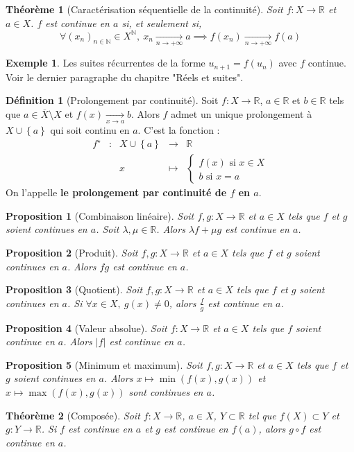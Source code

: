 \documentclass[french]{book}
\newcommand{\N}{\mathbb{N}}
\newcommand{\R}{\mathbb{R}}
\newcommand{\st}{^\star}
\theoremstyle{plain}
\newtheorem{thm}{Théorème}[chapter]
\newtheorem{prop}{Proposition}[chapter]
\theoremstyle{definition}
\newtheorem{dfn}{Définition}[chapter]
\newtheorem{exa}{Exemple}[chapter]
\theoremstyle{remark}
\begin{document}
\begin{thm}[Caractérisation séquentielle de la continuité]
	Soit $f:X\rightarrow\R$ et $a\in X$. $f$ est continue en $a$ si, et seulement si, $$\forall (x_n)_{n\in\N}\in X^\N,\ x_n\xrightarrow[n\to+\infty]{}a\implies f(x_n)\xrightarrow[n\to+\infty]{}f(a)$$
\end{thm}
\begin{exa}
	Les suites récurrentes de la forme $u_{n+1}=f(u_n)$ avec $f$ continue. Voir le dernier paragraphe du chapitre "Réels et suites".
\end{exa}
\begin{dfn}[Prolongement par continuité]
	Soit $f:X\rightarrow\R$, $a\in \R$ et $b\in\R$ tels que $a\in\overline{X}\setminus X$ et $f(x)\xrightarrow[x\to a]{}b$. Alors $f$ admet un unique prolongement à $X\cup\left\{a\right\}$ qui soit continu en $a$. C'est la fonction : $$\begin{array}{ccccc}f\st&:&X\cup\left\{a\right\}&\rightarrow&\R\\ &&x&\mapsto&\begin{cases}
			f(x)\text{ si }x\in X \\ b\text{ si }x=a
	\end{cases}\end{array}$$ On l'appelle \textbf{le prolongement par continuité de $f$ en $a$}.
\end{dfn}
\begin{prop}[Combinaison linéaire]
	Soit $f,g:X\rightarrow\R$ et $a\in X$ tels que $f$ et $g$ soient continues en $a$. Soit $\lambda,\mu\in\R$. Alors $\lambda f+\mu g$ est continue en $a$.
\end{prop}
\begin{prop}[Produit]
	Soit $f,g:X\rightarrow\R$ et $a\in X$ tels que $f$ et $g$ soient continues en $a$. Alors $fg$ est continue en $a$.
\end{prop}
\begin{prop}[Quotient]
	Soit $f,g:X\rightarrow\R$ et $a\in X$ tels que $f$ et $g$ soient continues en $a$. Si $\forall x\in X,\ g(x)\ne0$, alors $\displaystyle\frac{f}{g}$ est continue en $a$.
\end{prop}
\begin{prop}[Valeur absolue]
	Soit $f:X\rightarrow\R$ et $a\in X$ tels que $f$ soient continue en $a$. Alors $\lvert f\rvert$ est continue en $a$.
\end{prop}
\begin{prop}[Minimum et maximum]
	Soit $f,g:X\rightarrow\R$ et $a\in X$ tels que $f$ et $g$ soient continues en $a$. Alors $x\mapsto\min(f(x),g(x))$ et $x\mapsto\max(f(x),g(x))$ sont continues en $a$.
\end{prop}
\begin{thm}[Composée]
	Soit $f:X\rightarrow\R$, $a\in X$, $Y\subset\R$ tel que $f(X)\subset Y$ et $g:Y\rightarrow\R$. Si $f$ est continue en $a$ et $g$ est continue en $f(a)$, alors $g\circ f$ est continue en $a$.
\end{thm}
\end{document}
